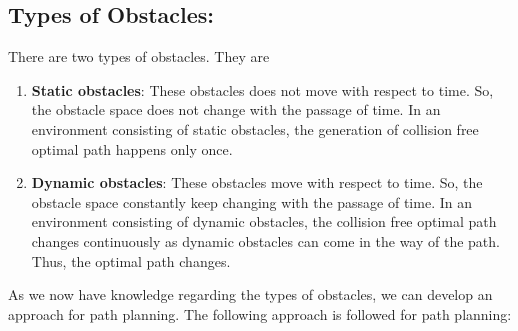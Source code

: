 \documentclass{IEEEtran}
\begin{document}
\subsection{\textbf{Types of Obstacles}:}There are two types of obstacles. They are
\begin{enumerate}
\item \textbf{Static obstacles}: These obstacles does not move with respect to time. So, the obstacle space does not change with the passage of time. In an environment consisting of static obstacles, the generation of collision free optimal path happens only once.
\item \textbf{Dynamic obstacles}: These obstacles move with respect to time. So, the obstacle space constantly keep changing with the passage of time.  In an environment consisting of dynamic obstacles, the collision free optimal path changes continuously as dynamic obstacles can come in the way of the path. Thus, the optimal path changes. \\
\end{enumerate} 
As we now have knowledge regarding the types of obstacles, we can develop an approach for path planning. The following approach is followed for path planning:
\end{document}
